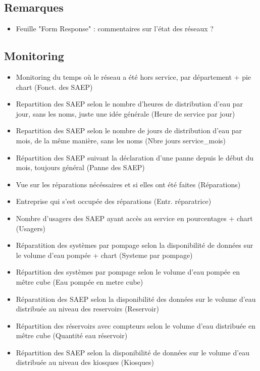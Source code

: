 \documentclass[a4paper, 11pt]{article}
\begin{document}
\subsection{Remarques}

\begin{itemize}
    \item Feuille "Form Response" : commentaires sur l'état des réseaux ?

\end{itemize}

\subsection{Monitoring}

\begin{itemize}
    \item Monitoring du temps où le réseau a été hors service, par département + pie chart (Fonct. des SAEP)
    \item Repartition des SAEP selon le nombre d'heures de distribution d'eau par jour, sans les noms, juste une idée générale (Heure de service par jour)
    \item  Repartition des SAEP selon le nombre de jours de distribution d'eau par mois, de la même manière, sans les noms (Nbre jours service\_mois)
    \item Répartition des SAEP suivant la déclaration d'une panne depuis le début du mois, toujours général (Panne des SAEP)
    \item Vue sur les réparations nécéssaires et si elles ont été faites (Réparations)
    \item Entreprise qui s'est occupée des réparations (Entr. réparatrice)
    \item Nombre d'usagers  des SAEP ayant accès au service en pourcentages + chart (Usagers)
    \item Réparatition des systèmes par pompage selon  la disponibilité de données sur le volume d'eau pompée + chart (Systeme par pompage)
    \item Répartition  des systèmes par pompage selon le volume d'eau pompée en mêtre cube (Eau pompée en metre cube)
    \item Réparatition des SAEP selon la disponibilité  des données sur le volume d'eau distribuée au niveau  des reservoirs (Reservoir)
    \item Répartition  des réservoirs avec compteurs selon le  volume  d'eau distribuée en mêtre cube (Quantité eau réservoir)
    \item Répartition des SAEP selon la disponibilité de données sur le volume d'eau distribuée au niveau des kiosques (Kiosques)

\end{itemize}
\end{document}
